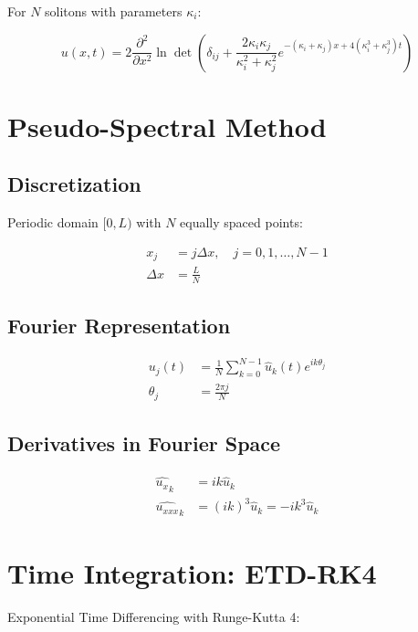 \documentclass{article}
\begin{document}
For $N$ solitons with parameters $\kappa_i$:

\begin{equation}
u(x,t) = 2 \frac{\partial^2}{\partial x^2} \ln \det\left(\delta_{ij} + \frac{2\kappa_i\kappa_j}{\kappa_i^2 + \kappa_j^2} e^{-(\kappa_i + \kappa_j)x + 4(\kappa_i^3 + \kappa_j^3)t}\right)
\end{equation}

\section{Pseudo-Spectral Method}

\subsection{Discretization}

Periodic domain $[0, L)$ with $N$ equally spaced points:

\begin{align}
x_j &= j \Delta x, \quad j = 0, 1, \dots, N-1 \\
\Delta x &= \frac{L}{N}
\end{align}

\subsection{Fourier Representation}

\begin{align}
u_j(t) &= \frac{1}{N} \sum_{k=0}^{N-1} \hat{u}_k(t) e^{i k \theta_j} \\
\theta_j &= \frac{2\pi j}{N}
\end{align}

\subsection{Derivatives in Fourier Space}

\begin{align}
\widehat{u_x}_k &= i k \hat{u}_k \\
\widehat{u_{xxx}}_k &= (ik)^3 \hat{u}_k = -i k^3 \hat{u}_k
\end{align}

\section{Time Integration: ETD-RK4}

Exponential Time Differencing with Runge-Kutta 4:
\end{document}
